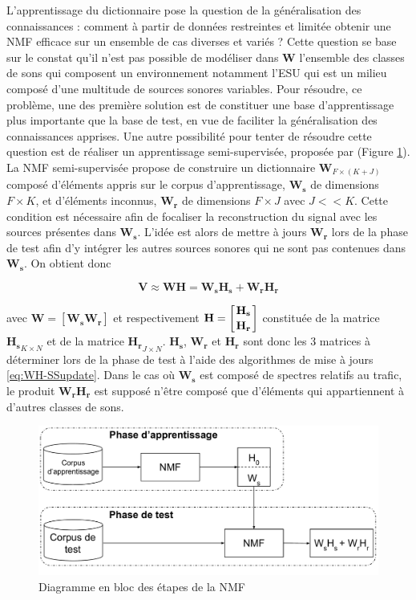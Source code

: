 L'apprentissage du dictionnaire pose la question de la généralisation des connaissances : comment à partir de données restreintes et limitée obtenir une NMF efficace sur un ensemble de cas diverses et variés ?  Cette question se base sur le constat qu'il n'est pas possible de modéliser dans $\mathbf{W}$ l'ensemble des classes de sons qui composent un environnement notamment l'ESU qui est un milieu composé d'une multitude de sources sonores variables. Pour résoudre, ce problème, une des première solution est de constituer une base d'apprentissage plus importante que la base de test, en vue de faciliter la généralisation des connaissances apprises.
Une autre possibilité pour tenter de résoudre cette question est de réaliser un apprentissage semi-supervisée, proposée par \cite{lee_semi-supervised_2010, smaragdis2007supervised} (Figure \ref{fig:semi-supervised_learning}). La NMF semi-supervisée propose de construire un dictionnaire $\mathbf{W}_{F \times (K+J)}$ composé d'éléments appris sur le corpus d'apprentissage, $\mathbf{W_s} $ de dimensions $F \times K$, et d'éléments inconnus, $\mathbf{W_r}$ de dimensions $F \times J$ avec $J << K$. Cette condition est nécessaire afin de focaliser la reconstruction du signal avec les sources présentes dans $\mathbf{W_s}$. L'idée est alors de mettre à jours $\mathbf{W_r}$ lors de la phase de test afin d'y intégrer les autres sources sonores qui ne sont pas contenues dans $\mathbf{W_s}$. On obtient donc 

\begin{equation}
\mathbf{V} \approx \mathbf{WH} = \mathbf{W_s} \mathbf{H_s} + \mathbf{W_r} \mathbf{H_r}
\end{equation}


avec $\mathbf{W} = \left[ \mathbf{W_s} \mathbf{W_r} \right]$ et respectivement $\mathbf{H} = \left[ \genfrac{}{}{0pt}{0}{\mathbf{H_s}}{\mathbf{H_r}} \right]$ constituée de la matrice $\mathbf{H_s}_{K \times N}$ et de la matrice $\mathbf{H_r}_{J \times N}$. $\mathbf{H_s}$, $\mathbf{W_r}$ et $\mathbf{H_r}$ sont donc les 3 matrices à déterminer lors de la phase de test à l'aide des algorithmes de mise à jours \ref{eq:WH-SSupdate}. Dans le cas où $\mathbf{W_s}$ est composé de spectres relatifs au trafic, le produit $\mathbf{W_r} \mathbf{H_r}$ est supposé n'être composé que d'éléments qui appartiennent à d'autres classes de sons. 

\begin{figure}[t]
\centering
\includegraphics[width=.85\linewidth]{./figures/NMF/NMF_semi-supervised.pdf}
\caption{Diagramme en bloc des étapes de la NMF}
\label{fig:semi-supervised_learning}
\end{figure}

